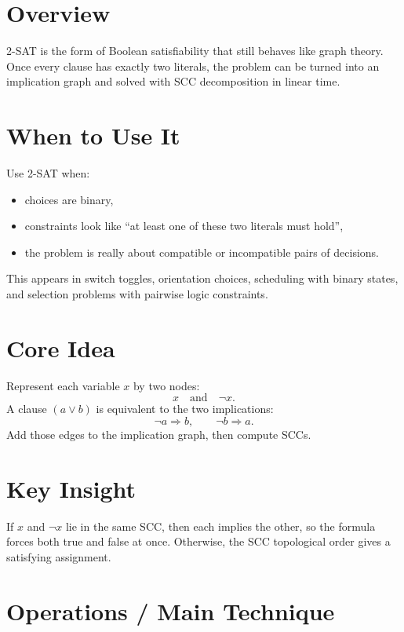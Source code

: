\section*{Overview}

2-SAT is the form of Boolean satisfiability that still behaves like graph theory. Once every clause has exactly two
literals, the problem can be turned into an implication graph and solved with SCC decomposition in linear time.

\section*{When to Use It}

Use 2-SAT when:

\begin{itemize}
  \item choices are binary,
  \item constraints look like ``at least one of these two literals must hold'',
  \item the problem is really about compatible or incompatible pairs of decisions.
\end{itemize}

This appears in switch toggles, orientation choices, scheduling with binary states, and selection problems with pairwise
logic constraints.

\section*{Core Idea}

Represent each variable \(x\) by two nodes:
\[
x \quad\text{and}\quad \lnot x.
\]
A clause \((a \lor b)\) is equivalent to the two implications:
\[
\lnot a \Rightarrow b,
\qquad
\lnot b \Rightarrow a.
\]
Add those edges to the implication graph, then compute SCCs.

\section*{Key Insight}

If \(x\) and \(\lnot x\) lie in the same SCC, then each implies the other, so the formula forces both true and false at
once. Otherwise, the SCC topological order gives a satisfying assignment.

\section*{Operations / Main Technique}

